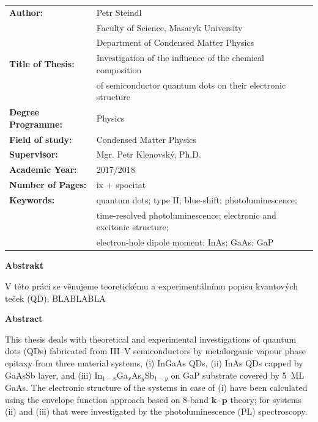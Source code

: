 \documentclass[
a4paper, %
11pt, %
onecolumn, %
openany, %
oldfontcommands,
]{memoir}
\begin{document}
\normalsize
\begin{tabular}{ll}
	\textbf{Author:} & Petr Steindl \\[-0.5cm]
	& Faculty of Science, Masaryk University \\[-0.5cm]
	& Department of Condensed Matter Physics \\[-0.5cm]
	\textbf{Title of Thesis:} &  Investigation of the influence of the chemical composition \\[-0.5cm]
	& of semiconductor quantum dots on their electronic structure\\
	\textbf{Degree Programme:}& Physics \\
	\textbf{Field of study:}& Condensed Matter Physics \\
	\textbf{Supervisor:}& Mgr. Petr Klenovský, Ph.D. \\
	\textbf{Academic Year:}& 2017/2018 \\
	\textbf{Number of Pages:}& ix + spocitat \\
	\textbf{Keywords:}& quantum dots; type II; blue-shift; photoluminescence; \\[-0.5cm]
	&time-resolved photoluminescence; electronic and excitonic structure;\\[-0.5cm]
	& electron-hole dipole moment; InAs; GaAs; GaP \\
\end{tabular}
\renewcommand{\arraystretch}{1} 
\newpage

\cleardoublepage
\noindent\Large\textbf{Abstrakt}\\ \normalsize

\noindent V této práci se věnujeme teoretickému a experimentálnímu popisu kvantových teček (QD). BLABLABLA

\vspace{3cm}
\vfill

\cleardoublepage
\noindent\Large\textbf{Abstract}\\ \normalsize

\noindent This thesis deals with theoretical and experimental investigations of quantum dots (QDs) fabricated from III--V semiconductors by metalorganic vapour phase epitaxy from three material systems, (i) InGaAs QDs, (ii) InAs QDs capped by GaAsSb layer, and (iii) In$_{1-x}$Ga$_x$As$_y$Sb$_{1-y}$ on GaP substrate covered by 5~ML GaAs. 
The electronic structure of the systems in case of (i) have been calculated using the envelope function approach based on 8-band $\mathbf{k\cdot p}$ theory; for systems (ii) and (iii) that were investigated by the photoluminescence (PL) spectroscopy.
\end{document}
